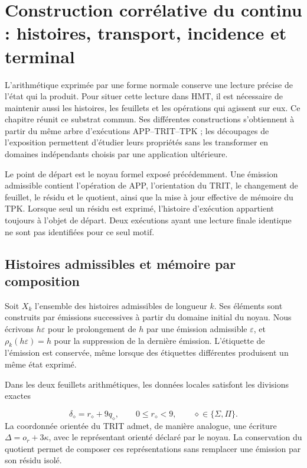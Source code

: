 \section{Construction corrélative du continu : histoires, transport, incidence et terminal}
\label{iv:continuo-conjunto}
L’arithmétique exprimée par une forme normale conserve une lecture précise de l’état qui la produit. Pour situer cette lecture dans HMT, il est nécessaire de maintenir aussi les histoires, les feuillets et les opérations qui agissent sur eux. Ce chapitre réunit ce substrat commun. Ses différentes constructions s’obtiennent à partir du même arbre d’exécutions APP–TRIT–TPK ; les découpages de l’exposition permettent d’étudier leurs propriétés sans les transformer en domaines indépendants choisis par une application ultérieure.

Le point de départ est le noyau formel exposé précédemment. Une émission admissible contient l’opération de APP, l’orientation du TRIT, le changement de feuillet, le résidu et le quotient, ainsi que la mise à jour effective de mémoire du TPK. Lorsque seul un résidu est exprimé, l’histoire d’exécution appartient toujours à l’objet de départ. Deux exécutions ayant une lecture finale identique ne sont pas identifiées pour ce seul motif.

\subsection{Histoires admissibles et mémoire par composition}
\label{iv:cont:historias}
Soit \(X_k\) l’ensemble des histoires admissibles de longueur \(k\). Ses éléments sont construits par émissions successives à partir du domaine initial du noyau. Nous écrivons \(h\varepsilon\) pour le prolongement de \(h\) par une émission admissible \(\varepsilon\), et \(\rho_k(h\varepsilon)=h\) pour la suppression de la dernière émission. L’étiquette de l’émission est conservée, même lorsque des étiquettes différentes produisent un même état exprimé.

Dans les deux feuillets arithmétiques, les données locales satisfont les divisions exactes

\[
\delta_\diamond=r_\diamond+9q_\diamond,
\qquad 0\leq r_\diamond<9,
\qquad \diamond\in\{\Sigma,\Pi\}.
\]
La coordonnée orientée du TRIT admet, de manière analogue, une écriture \(\Delta=o_r+3\kappa\), avec le représentant orienté déclaré par le noyau. La conservation du quotient permet de composer ces représentations sans remplacer une émission par son résidu isolé.

